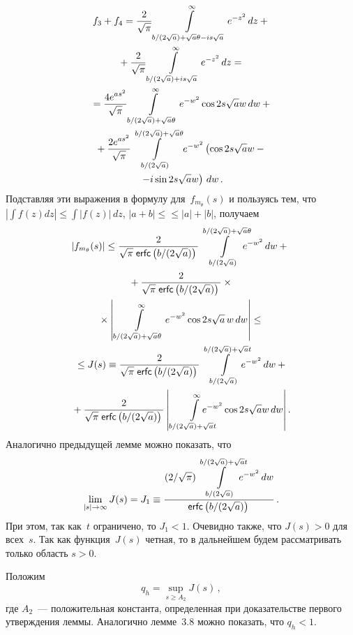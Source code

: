 \begin{multicols}{2}
\noindent
\begin{multline*}
f_3 + f_4 = \displaystyle\frac{\displaystyle 2\mathstrut}{\displaystyle \sqrt{\pi}\mathstrut}\int\limits_{{b}/({2\sqrt{a}}) + \sqrt{a}\theta - is\sqrt{a}}^{\infty}
e^{-z^2}\,dz +{}\\
{}+ \displaystyle\frac{\displaystyle 2\mathstrut}{\displaystyle \sqrt{\pi}\mathstrut}\int\limits_{{b}/({2\sqrt{a}}) + is\sqrt{a}}^{\infty} e^{-z^2}\,dz ={}\\
{}=
 \displaystyle\frac{\displaystyle 4e^{as^2}\mathstrut}{\displaystyle \sqrt{\pi}\mathstrut}\int\limits_{{b}/({2\sqrt{a}}) + \sqrt{a}\theta}^{\infty} 
 e^{-w^2} \cos 2s\sqrt{a} w\,dw +{}\\
 {}+
  \displaystyle\frac{\displaystyle 2e^{as^2}\mathstrut}{\displaystyle \sqrt{\pi}\mathstrut}\int\limits_{{b}/({2\sqrt{a}})}^{{b}/({2\sqrt{a}}) + \sqrt{a}\theta} e^{-w^2} 
  \left(\cos 2s\sqrt{a} w -{}\right.\\
  {}\left. - i\sin 2s\sqrt{a} w\right)\,dw\,.
\end{multline*}
Подставляя эти выражения в формулу для~$f_{m_{\theta}}(s)$ и
пользуясь тем, что $\left|\int f(z)dz\right| \leq \int |f(z)|\,dz$,
$|a + b| \leq$\linebreak $\leq |a| + |b|$, получаем
\begin{multline*}
\!|f_{m_{\theta}}(s)| \leq \fr{2}{\sqrt{\pi}\;{\sf erfc}\left(b/(2\sqrt{a})\right)} 
\int\limits_{{b}/({2\sqrt{a}})}^{{b}/({2\sqrt{a}}) + 
\sqrt{a}\theta}\!\!\!\!\! e^{-w^2}\,dw +{}\\
{}+ \fr{2}{\sqrt{\pi}\;{\sf erfc}\left(b/(2\sqrt{a})\right)}\times{}\\
{}\times \left|\,\int\limits_{{b}/({2\sqrt{a}}) + \sqrt{a}\theta}^{\infty} e^{-w^2} \cos 2s\sqrt{a}\, 
w\,dw\right| \leq{}\\
{}
\leq J(s) \equiv \fr{2}{\sqrt{\pi}\;{\sf erfc}\left(b/(2\sqrt{a})\right)} \int\limits_{{b}/({2\sqrt{a}})}^{{b}/({2\sqrt{a}}) + 
\sqrt{a}t} \!\!\!\!\!\!e^{-w^2}\,dw +{}\\
{}+ \fr{2}{\sqrt{\pi}\;{\sf erfc}\left(b/(2\sqrt{a})\right)}
\left|\,\int\limits_{{b}/({2\sqrt{a}}) + \sqrt{a}t}^{\infty}\!\!\!\!\!\!\!\!\!\!\! e^{-w^2} \cos 2s\sqrt{a} w\,dw\right|.
\end{multline*}
Аналогично предыдущей лемме можно показать, что
$$
\lim\limits_{|s|\to\infty} J(s) = J_1 \equiv 
\displaystyle\frac{\displaystyle ({2}/{\sqrt{\pi}})\int\limits_{{b}/({2\sqrt{a}})}^{{b}/({2\sqrt{a}})+\sqrt{a}t}
\!\!\!\!\!e^{-w^2}\,dw\mathstrut}{\displaystyle {\sf erfc}\left(b/(2\sqrt{a})\right)\mathstrut}\,.
$$
При этом, так как~$t$ ограничено, то $J_1<1$. Очевидно также, что $J(s)>0$ для всех~$s$. 
Так как функция~$J(s)$ четная, то в дальнейшем будем рассматривать только область $s > 0$.

Положим
$$
q_h = \sup_{s \geq A_2} J(s)\,,
$$
где $A_2$~--- положительная константа, определенная при доказательстве первого утверждения леммы. 
Аналогично лемме~3.8 можно показать, что $q_h < 1$.


\end{multicols}
